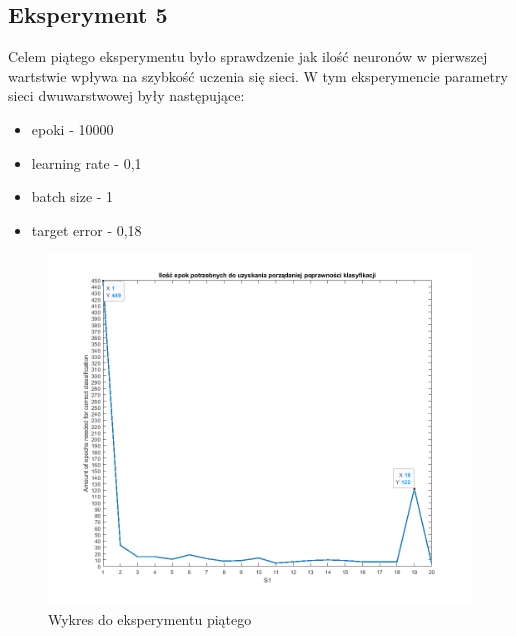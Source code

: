 \documentclass[12pt,twoside]{article}
\begin{document}
\subsection{Eksperyment 5}
Celem piątego eksperymentu było sprawdzenie jak ilość neuronów w pierwszej wartstwie wpływa na szybkość uczenia się sieci.
W tym eksperymencie parametry sieci dwuwarstwowej były następujące:
\begin{itemize}
	\item epoki - 10000
	\item learning rate - 0,1
	\item batch size - 1
	\item target error - 0,18
\end{itemize}
\begin{figure}[ht!]
	\centering
	\includegraphics[width=15cm]{figures/S1_epo.png}
	\caption{Wykres do eksperymentu piątego}
\end{figure}
\newpage
\end{document}
